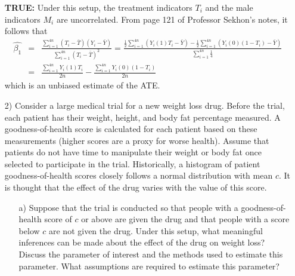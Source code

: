 \documentclass{article}
\begin{document}
\begin{itemize}
      \textbf{TRUE:} Under this setup, the treatment indicators $T_i$ and the
      male indicators $M_i$ are uncorrelated.  
      From page 121 of Professor Sekhon's notes, it follows that
      \begin{eqnarray*}
        \hat{\beta_1} &=& \frac{\sum_{i=1}^{4n}(T_i - \bar T)(Y_i - \bar Y)}{\sum_{i=1}^{4n}(T_i - \bar T)^2}
        =  \frac{\frac 1 2\sum_{i=1}^{4n} (Y_i(1)T_i- \bar Y) 
          - \frac 1 2\sum_{i=1}^{4n} (Y_i(0)(1-T_i)- \bar Y)}
          {\sum_{i=1}^{4n}\frac 1 4}\\&=&
         \frac{\sum_{i=1}^{4n} Y_i(1)T_i}{2n} - \frac{
           \sum_{i=1}^{4n} Y_i(0)(1-T_i)}
          {2n}
      \end{eqnarray*}
      which is an unbiased estimate of the ATE.
    \item[2)]
      Consider a large medical trial for a new weight loss drug.  
      Before the trial, 
      each patient has their weight, height, and body fat percentage measured.
      A goodness-of-health score 
      is calculated for each patient based on these measurements
      (higher scores are a proxy for worse health).
      Assume that patients do not have time to manipulate their weight or body fat
      once selected to participate in the trial.
      Historically, a histogram of patient goodness-of-health 
      scores closely follows a normal
      distribution with mean $c$.
      It is thought that the effect of the drug varies with the value of this score.
      \begin{itemize}
        \item[a)]  
          Suppose that the trial is conducted so that people with a 
          goodness-of-health score of $c$ or above 
          are given the drug and that people with a score below $c$ are not given the drug.
          Under this setup,
          what meaningful inferences can be made about the effect of the drug on weight loss? 
          Discuss the parameter of interest and the 
          methods used to estimate this parameter.
          What assumptions are required to estimate this parameter?
          

\end{itemize}
\end{itemize}
\end{document}
